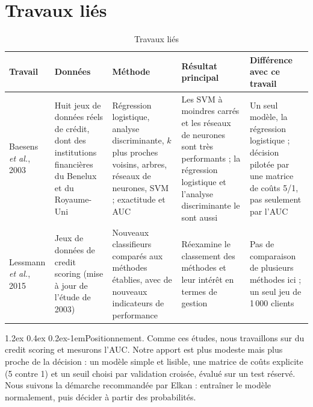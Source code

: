\documentclass[11pt,a4paper]{article}
\makeatletter
\renewcommand\paragraph{\@startsection{paragraph}{4}{\z@}%
  {1.2ex \@plus 0.4ex \@minus 0.2ex}{-1em}{\normalfont\normalsize\bfseries}}
\makeatother
\begin{document}
\section{Travaux liés}
\label{sec:travaux}
\begin{table}[htbp]
  \centering
  \caption{Travaux liés}
  \label{tab:travaux}
  \small
  \begin{tabular}{@{}P{2.4cm} P{2.8cm} P{2.8cm} P{3.4cm} P{3.8cm}@{}}
    \toprule
    Travail & Données & Méthode & Résultat principal & Différence avec ce travail \\
    \midrule
    Baesens \textit{et al.}, 2003 \cite{baesens} & Huit jeux de données réels de crédit, dont des institutions financières du Benelux et du Royaume-Uni & Régression logistique, analyse discriminante, $k$ plus proches voisins, arbres, réseaux de neurones, SVM ; exactitude et AUC & Les SVM à moindres carrés et les réseaux de neurones sont très performants ; la régression logistique et l'analyse discriminante le sont aussi & Un seul modèle, la régression logistique ; décision pilotée par une matrice de coûts 5/1, pas seulement par l'AUC \\
    Lessmann \textit{et al.}, 2015 \cite{lessmann} & Jeux de données de credit scoring (mise à jour de l'étude de 2003) & Nouveaux classifieurs comparés aux méthodes établies, avec de nouveaux indicateurs de performance & Réexamine le classement des méthodes et leur intérêt en termes de gestion & Pas de comparaison de plusieurs méthodes ici ; un seul jeu de 1\,000 clients \\
    \bottomrule
  \end{tabular}
\end{table}

\paragraph{Positionnement.} Comme ces études, nous travaillons sur du credit scoring et mesurons l'AUC. Notre apport est plus modeste mais plus proche de la décision : un modèle simple et lisible, une matrice de coûts explicite (5 contre 1) et un seuil choisi par validation croisée, évalué sur un test réservé. Nous suivons la démarche recommandée par Elkan \cite{elkan} : entraîner le modèle normalement, puis décider à partir des probabilités.

\end{document}
